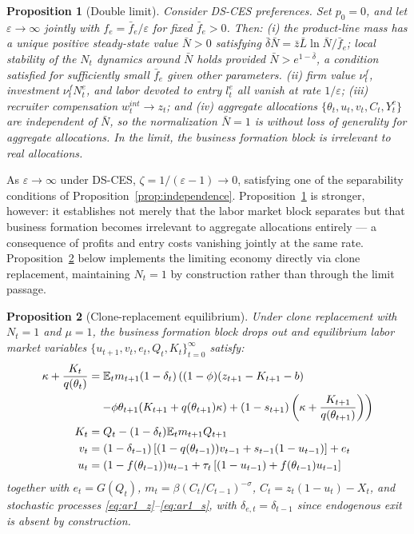 \documentclass[authoryear, review, 12pt]{elsarticle}
\newtheorem{proposition}{Proposition}
\begin{document}
\begin{proposition}[Double limit]
	\label{prop:double_limit}
	Consider DS-CES preferences. Set $p_0=0$, and let 
	$\varepsilon\to\infty$ jointly with $f_e=\bar{f}_e/
	\varepsilon$ for fixed $\bar{f}_e>0$. Then: \emph{(i)} the product-line mass has a unique 
	positive steady-state value $\bar{N}>0$ satisfying 
	$\bar{\delta}\bar{N} = \bar{z}\bar{L}\ln\bar{N}/
	\bar{f}_e$; local stability of the $N_t$ dynamics 
	around $\bar{N}$ holds provided 
	$\bar{N}>e^{1-\bar{\delta}}$, a condition satisfied 
	for sufficiently small $\bar{f}_e$ given other 
	parameters. \emph{(ii)} firm 
	value $\nu_t^f$, investment $\nu_t^f N_t^e$, and 
	labor devoted to entry $l_t^e$ all vanish at rate 
	$1/\varepsilon$; \emph{(iii)} recruiter compensation 
	$w_t^{int}\to z_t$; and \emph{(iv)} aggregate 
	allocations $\{\theta_t, u_t, v_t, C_t, Y_t^c\}$ 
	are independent of $\bar{N}$, so the normalization 
	$\bar{N}=1$ is without loss of generality for 
	aggregate allocations. In the limit, the business 
	formation block is irrelevant to real allocations.
\end{proposition}

As $\varepsilon\to\infty$ under DS-CES, 
$\zeta=1/(\varepsilon-1)\to 0$, satisfying one of 
the separability conditions of 
Proposition~\ref{prop:independence}. 
Proposition~\ref{prop:double_limit} is stronger, 
however: it establishes not merely that the labor 
market block separates but that business formation 
becomes irrelevant to aggregate allocations entirely 
--- a consequence of profits and entry costs 
vanishing jointly at the same rate. 
Proposition~\ref{prop:ags} below implements the 
limiting economy directly via clone replacement, 
maintaining $N_t=1$ by construction rather than 
through the limit passage.

\begin{proposition}[Clone-replacement equilibrium]
	\label{prop:ags}
	Under clone replacement with $N_t=1$ and $\mu=1$, 
	the business formation block drops out and equilibrium 
	labor market variables 
	$\{u_{t+1},v_t,e_t,Q_t,K_t\}_{t=0}^\infty$ satisfy:
	\begin{align}
		\label{eq:jcc_ags}
		\kappa+\frac{K_t}{q(\theta_t)} &= 
		\mathbb{E}_t m_{t+1}(1-\delta_t)
		\left((1-\phi)(z_{t+1}-K_{t+1}-b) \right.\notag\\
		&\quad\left. -\phi\theta_{t+1}
		(K_{t+1}+q(\theta_{t+1})\kappa)
		+(1-s_{t+1})\left(\kappa+
		\frac{K_{t+1}}{q(\theta_{t+1})}\right)\right)\\
		\label{eq:K_ags}
		K_t &= Q_t-(1-\delta_t)\mathbb{E}_t 
		m_{t+1}Q_{t+1}\\
		\label{eq:v_ags}
		v_t &= (1-\delta_{t-1})
		\left[(1-q(\theta_{t-1}))v_{t-1}
		+s_{t-1}(1-u_{t-1})\right]+e_t\\
		\label{eq:u_ags}
		u_t &= (1-f(\theta_{t-1}))u_{t-1}
		+\tau_t\left[(1-u_{t-1})
		+f(\theta_{t-1})u_{t-1}\right]
	\end{align}
	together with $e_t=G(Q_t)$, 
	$m_t=\beta(C_t/C_{t-1})^{-\sigma}$, 
	$C_t=z_t(1-u_t)-X_t$, and stochastic processes 
	\eqref{eq:ar1_z}--\eqref{eq:ar1_s}, with 
	$\delta_{e,t}=\delta_{t-1}$ since endogenous exit 
	is absent by construction.
\end{proposition}
\end{document}
